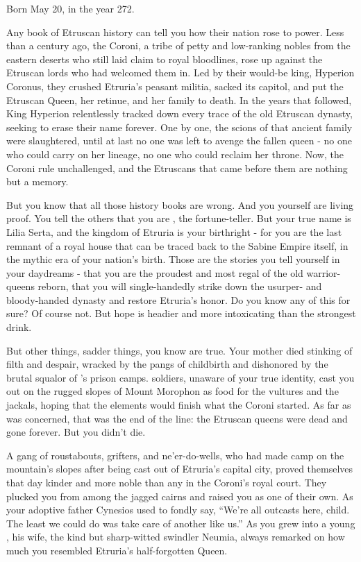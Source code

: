 \documentclass[char]{Kos}
\begin{document}
\name{\cBurglar{}}

Born May 20, in the year 272.

    Any book of Etruscan history can tell you how their nation rose to power. Less than a century ago, the Coroni, a tribe of petty and low-ranking nobles from the eastern deserts who still laid claim to royal bloodlines, rose up against the Etruscan lords who had welcomed them in. Led by their would-be king, Hyperion Coronus, they crushed Etruria's peasant militia, sacked its capitol, and put the Etruscan Queen, her retinue, and her family to death. In the years that followed, King Hyperion relentlessly tracked down every trace of the old Etruscan dynasty, seeking to erase their name forever. One by one, the scions of that ancient family were slaughtered, until at last no one was left to avenge the fallen queen - no one who could carry on her lineage, no one who could reclaim her throne. Now, the Coroni rule unchallenged, and the Etruscans that came before them are nothing but a memory. 

    But you know that all those history books are wrong. And you yourself are living proof. You tell the others that you are \cBurglar{}, the fortune-teller. But your true name is Lilia Serta, and the kingdom of Etruria is your birthright - for you are the last remnant of a royal house that can be traced back to the Sabine Empire itself, in the mythic era of your nation's birth. Those are the stories you tell yourself in your daydreams - that you are the proudest and most regal of the old warrior-queens reborn, that you will single-handedly strike down \cEtruriaKing{} the usurper-\cEtruriaKing{\monarch} and \cEtruriaKing{\their} bloody-handed dynasty and restore Etruria's honor. Do you know any of this for sure? Of course not. But hope is headier and more intoxicating than the strongest drink.

    But other things, sadder things, you know are true. Your mother died stinking of filth and despair, wracked by the pangs of childbirth and dishonored by the brutal squalor of \cEtruriaKing{\Monarch} \cEtruriaKing{}'s prison camps. \cEtruriaKing{\Their} soldiers, unaware of your true identity, cast you out on the rugged slopes of Mount Morophon as food for the vultures and the jackals, hoping that the elements would finish what the Coroni started. As far as \cEtruriaKing{\Monarch} \cEtruriaKing{} was concerned, that was the end of the line: the Etruscan queens were dead and gone forever. But you didn't die. 

    A gang of roustabouts, grifters, and ne'er-do-wells, who had made camp on the mountain's slopes after being cast out of Etruria's capital city, proved themselves that day kinder and more noble than any in the Coroni's royal court. They plucked you from among the jagged cairns and raised you as one of their own. As your adoptive father Cynesios used to fondly say, ``We're all outcasts here, child. The least we could do was take care of another like us.'' As you grew into a young \cBurglar{\human}, his wife, the kind but sharp-witted swindler Neumia, always remarked on how much you resembled Etruria's half-forgotten Queen. 
\end{document}

